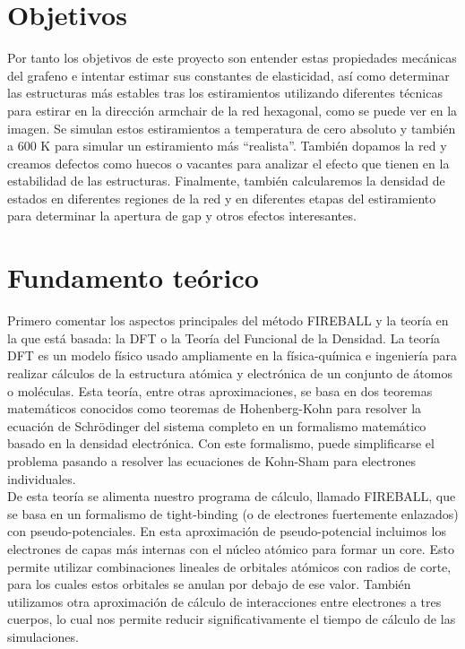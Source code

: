 \section{Objetivos}

Por tanto los objetivos de este proyecto son entender estas propiedades mecánicas del grafeno e intentar estimar sus constantes de elasticidad, así como determinar las estructuras más estables tras los estiramientos utilizando diferentes técnicas para estirar en la dirección armchair de la red hexagonal, como se puede ver en la imagen. Se simulan estos estiramientos a temperatura de cero absoluto y también a 600 K para simular un estiramiento más ``realista''. También dopamos la red y creamos defectos como huecos o vacantes para analizar el efecto que tienen en la estabilidad de las estructuras. Finalmente, también calcularemos la densidad de estados en diferentes regiones de la red y en diferentes etapas del estiramiento para determinar la apertura de gap y otros efectos interesantes.\\

\pasa 

\section{Fundamento teórico}

Primero comentar los aspectos principales del método FIREBALL y la teoría en la que está basada: la DFT o la Teoría del Funcional de la Densidad. La teoría DFT es un modelo físico usado ampliamente en la física-química e ingeniería para realizar cálculos de la estructura atómica y electrónica de un conjunto de átomos o moléculas. Esta teoría, entre otras aproximaciones, se basa en dos teoremas matemáticos conocidos como teoremas de Hohenberg-Kohn para resolver la ecuación de Schrödinger del sistema completo en un formalismo matemático basado en la densidad electrónica. Con este formalismo, puede simplificarse el problema pasando a resolver las ecuaciones de Kohn-Sham para electrones individuales. \\

De esta teoría se alimenta nuestro programa de cálculo, llamado FIREBALL, que se basa en un formalismo de tight-binding (o de electrones fuertemente enlazados) con pseudo-potenciales. En esta aproximación de pseudo-potencial incluimos los electrones de capas más internas con el núcleo atómico para formar un core. Esto permite utilizar combinaciones lineales de orbitales atómicos con radios de corte, para los cuales estos orbitales se anulan por debajo de ese valor. También utilizamos otra aproximación de cálculo de interacciones entre electrones a tres cuerpos, lo cual nos permite reducir significativamente el tiempo de cálculo de las simulaciones. \\

